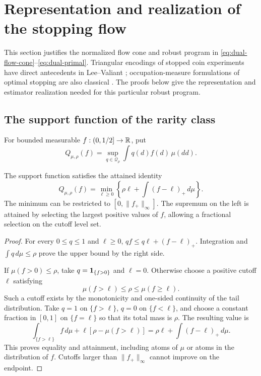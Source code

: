 \section{Representation and realization of the stopping flow}
\label{sec:flow-foundations}

This section justifies the normalized flow cone and robust program in
\eqref{eq:dual-flow-cone}--\eqref{eq:dual-primal}. Triangular encodings
of stopped coin experiments have direct antecedents in Lee--Valiant
\cite{leevaliant}; occupation-measure formulations of optimal stopping are
also classical \cite{cs}. The proofs below give the representation
and estimator realization needed for this particular robust program.

\subsection{The support function of the rarity class}

For bounded measurable $f:(0,1/2]\to\mathbb R$, put
\[
 Q_{\mu,\rho}(f)
 =\sup_{q\in\mathcal Q_\rho}\int q(d)f(d)\,\mu(dd).
\]

\begin{lemma}\label{lem:ff-support}
The support function satisfies the attained identity
\begin{equation}\label{eq:ff-support}
 Q_{\mu,\rho}(f)
 =\min_{\ell\ge0}
       \left\{\rho\ell+\int(f-\ell)_+\,d\mu\right\}.
\end{equation}
The minimum can be restricted to
$[0,\|f_+\|_\infty]$. The supremum on the left is attained by selecting
the largest positive values of $f$, allowing a fractional selection
on the cutoff level set.
\end{lemma}

\begin{proof}
For every $0\le q\le1$ and $\ell\ge0$,
$qf\le q\ell+(f-\ell)_+$. Integration and $\int q\,d\mu\le\rho$
prove the upper bound by the right side.

If $\mu(f>0)\le\rho$, take $q=\mathbf 1_{\{f>0\}}$ and $\ell=0$.
Otherwise choose a positive cutoff $\ell$ satisfying
\[
 \mu(f>\ell)\le\rho\le\mu(f\ge\ell).
\]
Such a cutoff exists by the monotonicity and one-sided continuity of
the tail distribution. Take $q=1$ on $\{f>\ell\}$, $q=0$ on
$\{f<\ell\}$, and choose a constant fraction in $[0,1]$ on
$\{f=\ell\}$ so that its total mass is $\rho$.
The resulting value is
\[
 \int_{\{f>\ell\}}f\,d\mu
   +\ell[\rho-\mu(f>\ell)]
 =\rho\ell+\int(f-\ell)_+\,d\mu.
\]
This proves equality and attainment, including atoms of $\mu$ or
atoms in the distribution of $f$. Cutoffs larger than
$\|f_+\|_\infty$ cannot improve on the endpoint.
\end{proof}

